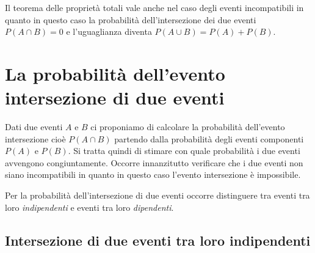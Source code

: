 \osservazione Il teorema delle proprietà totali vale anche nel caso degli 
eventi 
incompatibili in quanto in questo caso la probabilità dell'intersezione dei 
due 
eventi \(P(A\cap B)=0\) e l'uguaglianza diventa \(P(A\cup B)=P(A)+P(B)\).


\section{La probabilità dell'evento intersezione di due eventi}
\label{sec:04_intersezione}

Dati due eventi \(A\) e \(B\) ci proponiamo di calcolare la probabilità 
dell'evento intersezione cioè \(P(A\cap B)\) partendo dalla probabilità degli 
eventi componenti \( P(A) \) e \( P(B) \). Si tratta quindi di stimare con quale 
probabilità i due eventi avvengono congiuntamente. Occorre innanzitutto 
verificare che i due eventi non siano incompatibili in quanto in questo caso 
l'evento intersezione è impossibile.

Per la probabilità dell'intersezione di due eventi occorre distinguere tra 
eventi tra loro \emph{indipendenti} e eventi tra loro \emph{dipendenti}.

\subsection{Intersezione di due eventi tra loro indipendenti}

